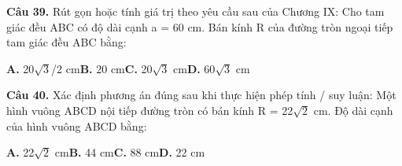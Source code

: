 \documentclass[11pt,a4paper]{article}
\begin{document}
\textbf{\color{primary} Câu 39.} Rút gọn hoặc tính giá trị theo yêu cầu sau của Chương IX: Cho tam giác đều ABC có độ dài cạnh a = 60 cm. Bán kính R của đường tròn ngoại tiếp tam giác đều ABC bằng:\par
\hspace*{1.5em}\textbf{A.} 20$\sqrt{3}$/2 cm\quad\quad \textbf{B.} 20 cm\quad\quad \textbf{C.} 20$\sqrt{3}$ cm\quad\quad \textbf{D.} 60$\sqrt{3}$ cm\par\vspace{2pt}
\textbf{\color{primary} Câu 40.} Xác định phương án đúng sau khi thực hiện phép tính / suy luận: Một hình vuông ABCD nội tiếp đường tròn có bán kính R = 22$\sqrt{2}$ cm. Độ dài cạnh của hình vuông ABCD bằng:\par
\hspace*{1.5em}\textbf{A.} 22$\sqrt{2}$ cm\quad\quad \textbf{B.} 44 cm\quad\quad \textbf{C.} 88 cm\quad\quad \textbf{D.} 22 cm\par\vspace{2pt}
\end{document}
